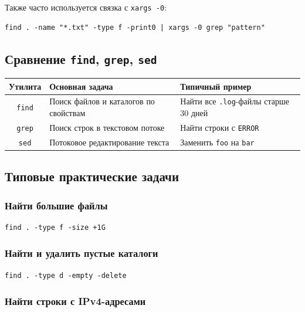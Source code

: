 \documentclass[12pt,a4paper]{article}
\begin{document}
Также часто используется связка с \texttt{xargs -0}:

\begin{verbatim}
find . -name "*.txt" -type f -print0 | xargs -0 grep "pattern"
\end{verbatim}

\subsection{Сравнение \texttt{find}, \texttt{grep}, \texttt{sed}}

\begin{center}
\begin{tabular}{|c|p{4cm}|p{6cm}|}
\hline
Утилита & Основная задача & Типичный пример \\
\hline
\texttt{find} & Поиск файлов и каталогов по свойствам & Найти все \texttt{.log}-файлы старше 30 дней \\
\hline
\texttt{grep} & Поиск строк в текстовом потоке & Найти строки с \texttt{ERROR} \\
\hline
\texttt{sed} & Потоковое редактирование текста & Заменить \texttt{foo} на \texttt{bar} \\
\hline
\end{tabular}
\end{center}

\subsection{Типовые практические задачи}

\subsubsection{Найти большие файлы}

\begin{verbatim}
find . -type f -size +1G
\end{verbatim}

\subsubsection{Найти и удалить пустые каталоги}

\begin{verbatim}
find . -type d -empty -delete
\end{verbatim}

\subsubsection{Найти строки с IPv4-адресами}
\end{document}
